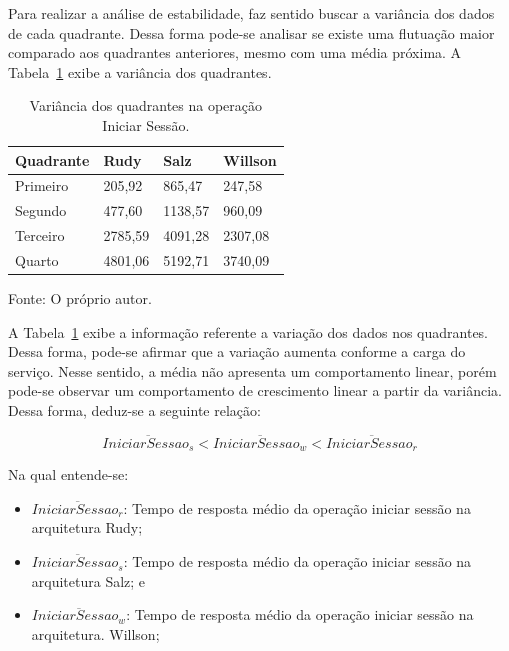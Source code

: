 Para realizar a análise de estabilidade, faz sentido buscar a variância dos dados de cada quadrante.
%
Dessa forma pode-se analisar se existe uma flutuação maior comparado aos quadrantes anteriores, mesmo com uma média próxima.
%
A Tabela~\ref{tab:op_start_session_var} exibe a variância dos quadrantes.


\begin{table}[htb!]
\centering
\begin{adjustbox}{max width=\textwidth}
\caption{Variância dos quadrantes na operação Iniciar Sessão.}
\label{tab:op_start_session_var}
\begin{tabular}{l|l|l|l}

\hline \hline

Quadrante & Rudy    & Salz    & Willson \\ \hline \hline

Primeiro  & 205,92 & 865,47 & 247,58 \\ \hline

Segundo   & 477,60 & 1138,57 & 960,09 \\ \hline

Terceiro  & 2785,59 & 4091,28 & 2307,08 \\ \hline

Quarto    & 4801,06 & 5192,71 & 3740,09 \\ \hline \hline

\end{tabular}

\end{adjustbox}

Fonte: O próprio autor.
\end{table}

A Tabela~\ref{tab:op_start_session_var} exibe a informação referente a variação dos dados nos quadrantes.
%
Dessa forma, pode-se afirmar que a variação aumenta conforme a carga do serviço.
%
Nesse sentido, a média não apresenta um comportamento linear, porém pode-se observar um comportamento de crescimento linear a partir da variância.
%
Dessa forma, deduz-se a seguinte relação:

$$
  \overline{IniciarSessao_{s}} < \overline{IniciarSessao_{w}} <\overline{IniciarSessao_{r}}
$$

Na qual entende-se:

\begin{itemize}
 \item $\overline{IniciarSessao_{r}}$: Tempo de resposta médio da operação iniciar sessão na arquitetura Rudy;
 \item $\overline{IniciarSessao_{s}}$: Tempo de resposta médio da operação iniciar sessão na arquitetura Salz; e
 \item $\overline{IniciarSessao_{w}}$: Tempo de resposta médio da operação iniciar sessão na arquitetura. Willson;
\end{itemize}

